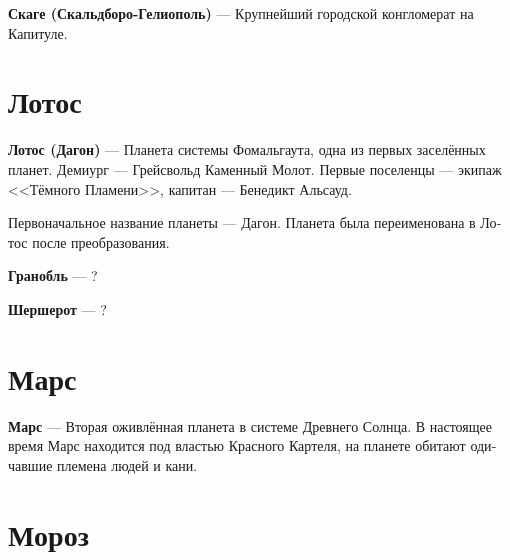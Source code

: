 \documentclass[a4paper,12pt,fleqn]{book}\usepackage{polyglossia}\setdefaultlanguage[babelshorthands=true]{russian}\setotherlanguage{english}\defaultfontfeatures{Ligatures=TeX,Mapping=tex-text}\usepackage{xcolor}\newcommand{\ml}[3]{#2}
\newcommand{\asterism}{\vspace{1em}{\centering\Large\bfseries$\ast~\ast~\ast$\par}\vspace{1em}}
\newcommand{\theterm}[3]{\textbf{\hypertarget{#1}{#2}} --- #3}
\begin{document}
\asterism

\theterm{scage}
{Скаге (Скальдборо-Гелиополь)}
{Крупнейший городской конгломерат на Капитуле.}

\section{Лотос}

\theterm{lotus}
{Лотос (Дагон)}
{Планета системы Фомальгаута, одна из первых заселённых планет.
Демиург --- Грейсвольд Каменный Молот.
Первые поселенцы --- экипаж <<Тёмного Пламени>>, капитан --- Бенедикт Альсауд.

Первоначальное название планеты --- Дагон.
Планета была переименована в Лотос после преобразования.}

\asterism

\theterm{granoble}
{Гранобль}
{?}

\theterm{chercherotte}
{Шершерот}
{?}

\section{Марс}

\theterm{mars}
{Марс}
{Вторая оживлённая планета в системе Древнего Солнца.
В настоящее время Марс находится под властью Красного Картеля, на планете обитают одичавшие племена людей и кани.}

\section{Мороз}
\end{document}
